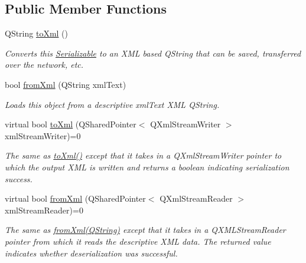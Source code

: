 \subsection*{Public Member Functions}
\begin{DoxyCompactItemize}
\item 
\hypertarget{class_picto_1_1_serializable_a2715cc957dfee3198e54643f546eba26}{Q\-String \hyperlink{class_picto_1_1_serializable_a2715cc957dfee3198e54643f546eba26}{to\-Xml} ()}\label{class_picto_1_1_serializable_a2715cc957dfee3198e54643f546eba26}

\begin{DoxyCompactList}\small\item\em Converts this \hyperlink{class_picto_1_1_serializable}{Serializable} to an X\-M\-L based Q\-String that can be saved, transferred over the network, etc. \end{DoxyCompactList}\item 
bool \hyperlink{class_picto_1_1_serializable_acbaf02a158b3440a16bc1a84ebaa4481}{from\-Xml} (Q\-String xml\-Text)
\begin{DoxyCompactList}\small\item\em Loads this object from a descriptive xml\-Text X\-M\-L Q\-String. \end{DoxyCompactList}\item 
\hypertarget{class_picto_1_1_serializable_a0357f9be4b2b92f7b1d63a7b353e56c1}{virtual bool \hyperlink{class_picto_1_1_serializable_a0357f9be4b2b92f7b1d63a7b353e56c1}{to\-Xml} (Q\-Shared\-Pointer$<$ Q\-Xml\-Stream\-Writer $>$ xml\-Stream\-Writer)=0}\label{class_picto_1_1_serializable_a0357f9be4b2b92f7b1d63a7b353e56c1}

\begin{DoxyCompactList}\small\item\em The same as \hyperlink{class_picto_1_1_serializable_a2715cc957dfee3198e54643f546eba26}{to\-Xml()} except that it takes in a Q\-Xml\-Stream\-Writer pointer to which the output X\-M\-L is written and returns a boolean indicating serialization success. \end{DoxyCompactList}\item 
\hypertarget{class_picto_1_1_serializable_aa328e85f57f163795bf4be7388719031}{virtual bool \hyperlink{class_picto_1_1_serializable_aa328e85f57f163795bf4be7388719031}{from\-Xml} (Q\-Shared\-Pointer$<$ Q\-Xml\-Stream\-Reader $>$ xml\-Stream\-Reader)=0}\label{class_picto_1_1_serializable_aa328e85f57f163795bf4be7388719031}

\begin{DoxyCompactList}\small\item\em The same as \hyperlink{class_picto_1_1_serializable_acbaf02a158b3440a16bc1a84ebaa4481}{from\-Xml(\-Q\-String)} except that it takes in a Q\-X\-M\-L\-Stream\-Reader pointer from which it reads the descriptive X\-M\-L data. The returned value indicates whether deserialization was successful. \end{DoxyCompactList}\end{DoxyCompactItemize}
